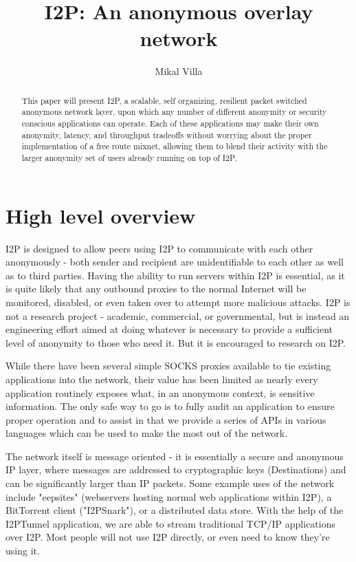 \documentclass[a4paper,twocolumn,12pt]{article}
\title{I2P: An anonymous overlay network}
\author{Mikal Villa}
\begin{document}
\maketitle

\begin{abstract}\noindent
This paper will present I2P, a scalable, self organizing, resilient packet switched anonymous network layer, upon which any number of different anonymity or security conscious applications can operate. Each of these applications may make their own anonymity, latency, and throughput tradeoffs without worrying about the proper implementation of a free route mixnet, allowing them to blend their activity with the larger anonymity set of users already running on top of I2P.
\end{abstract}

\tableofcontents

\section{High level overview}

I2P is designed to allow peers using I2P to communicate with each other anonymously - both sender and recipient are unidentifiable to each other as well as to third parties. Having the ability to run servers within I2P is essential, as it is quite likely that any outbound proxies to the normal Internet will be monitored, disabled, or even taken over to attempt more malicious attacks. I2P is not a research project - academic, commercial, or governmental, but is instead an engineering effort aimed at doing whatever is necessary to provide a sufficient level of anonymity to those who need it. But it is encouraged to research on I2P. 

While there have been several simple SOCKS proxies available to tie existing applications into the network, their value has been limited as nearly every application routinely exposes what, in an anonymous context, is sensitive information. The only safe way to go is to fully audit an application to ensure proper operation and to assist in that we provide a series of APIs in various languages which can be used to make the most out of the network.

The network itself is message oriented - it is essentially a secure and anonymous IP layer, where messages are addressed to cryptographic keys (Destinations) and can be significantly larger than IP packets. Some example uses of the network include "eepsites" (webservers hosting normal web applications within I2P), a BitTorrent client ("I2PSnark"), or a distributed data store. With the help of the I2PTunnel application, we are able to stream traditional TCP/IP applications over I2P. Most people will not use I2P directly, or even need to know they're using it.
\end{document}
